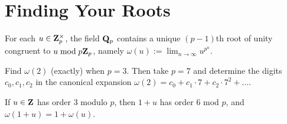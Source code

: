 \section*{Finding Your Roots}

\begin{prob}\label{prob:teichmuller} For each $u \in \mathbf{Z}_p^{\times}$, the field $\mathbf{Q}_p$ contains a unique $(p-1)$th root of unity congruent to $u\bmod{p\mathbf{Z}_p}$, namely $\omega(u):= \lim_{n\to\infty} u^{p^n}$.
\end{prob}

\begin{prob}\label{prob:teichmullercalculation} Find $\omega(2)$ (exactly) when $p=3$. Then take $p=7$ and determine the digits $c_0, c_1, c_2$ in the canonical expansion $\omega(2) =  c_0 + c_1 \cdot 7 + c_2 \cdot 7^2 + \dots$.
\end{prob}

\begin{prob}\label{prob:WJteich} If $u\in \mathbf{Z}$ has order $3$ modulo $p$, then $1+u$ has order $6$ mod $p$, and $\omega(1+u)=1+\omega(u)$.
\end{prob}




 
